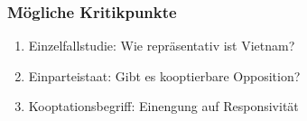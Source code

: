 \documentclass{beamer}\usepackage[]{graphicx}\usepackage[]{color}
\begin{document}
\begin{frame}
  \frametitle{Mögliche Kritikpunkte}
  \begin{enumerate}
    \item Einzelfallstudie: Wie repräsentativ ist Vietnam?
    \item Einparteistaat: Gibt es kooptierbare Opposition?
    \item Kooptationsbegriff: Einengung auf Responsivität
  \end{enumerate}
\end{frame}
\end{document}
